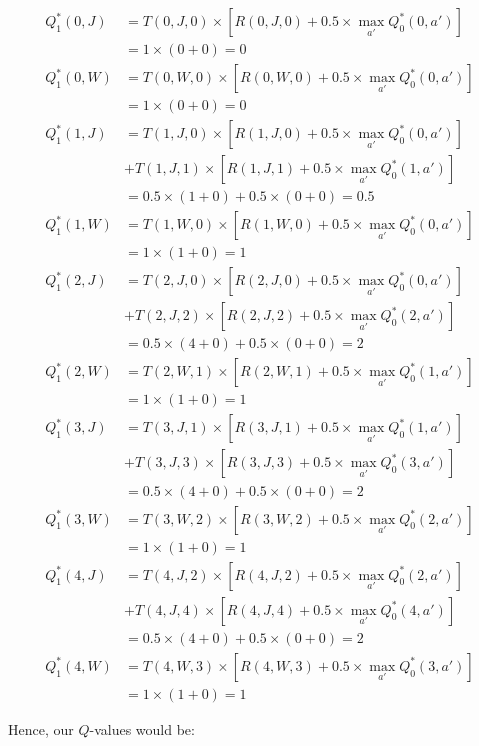 \documentclass[11pt,fancychapters]{article}
\begin{document}
\begin{align*}
	Q_1^* (0, J) &= T(0, J, 0) \times [R(0, J, 0) + 0.5 \times \max_{a'}Q_0^*(0, a')] \\
	&= 1 \times (0 + 0) = 0 \\
	Q_1^* (0, W) &= T(0, W, 0) \times [R(0, W, 0) + 0.5 \times \max_{a'}Q_0^*(0, a')] \\
	&= 1 \times (0 + 0) = 0 \\
	Q_1^* (1, J) &= T(1, J, 0) \times [R(1, J, 0) + 0.5 \times \max_{a'}Q_0^*(0, a')] \\
	&+ T(1, J, 1) \times [R(1, J, 1) + 0.5 \times \max_{a'}Q_0^*(1, a')] \\
	&= 0.5 \times (1 + 0) + 0.5 \times (0 + 0) = 0.5 \\
	Q_1^* (1, W) &= T(1, W, 0) \times [R(1, W, 0) + 0.5 \times \max_{a'}Q_0^*(0, a')] \\
	&= 1 \times (1 + 0) = 1 \\
	Q_1^* (2, J) &= T(2, J, 0) \times [R(2, J, 0) + 0.5 \times \max_{a'}Q_0^*(0, a')] \\
	&+ T(2, J, 2) \times [R(2, J, 2) + 0.5 \times \max_{a'}Q_0^*(2, a')] \\
	&= 0.5 \times (4 + 0) + 0.5 \times (0 + 0) = 2 \\
	Q_1^* (2, W) &= T(2, W, 1) \times [R(2, W, 1) + 0.5 \times \max_{a'}Q_0^*(1, a')] \\
	&= 1 \times (1 + 0) = 1 \\
	Q_1^* (3, J) &= T(3, J, 1) \times [R(3, J, 1) + 0.5 \times \max_{a'}Q_0^*(1, a')] \\
	&+ T(3, J, 3) \times [R(3, J, 3) + 0.5 \times \max_{a'}Q_0^*(3, a')] \\
	&= 0.5 \times (4 + 0) + 0.5 \times (0 + 0) = 2 \\
	Q_1^* (3, W) &= T(3, W, 2) \times [R(3, W, 2) + 0.5 \times \max_{a'}Q_0^*(2, a')] \\
	&= 1 \times (1 + 0) = 1 \\
	Q_1^* (4, J) &= T(4, J, 2) \times [R(4, J, 2) + 0.5 \times \max_{a'}Q_0^*(2, a')] \\
	&+ T(4, J, 4) \times [R(4, J, 4) + 0.5 \times \max_{a'}Q_0^*(4, a')] \\
	&= 0.5 \times (4 + 0) + 0.5 \times (0 + 0) = 2 \\
	Q_1^* (4, W) &= T(4, W, 3) \times [R(4, W, 3) + 0.5 \times \max_{a'}Q_0^*(3, a')] \\
	&= 1 \times (1 + 0) = 1
\end{align*}

Hence, our $Q$-values would be:
\end{document}
